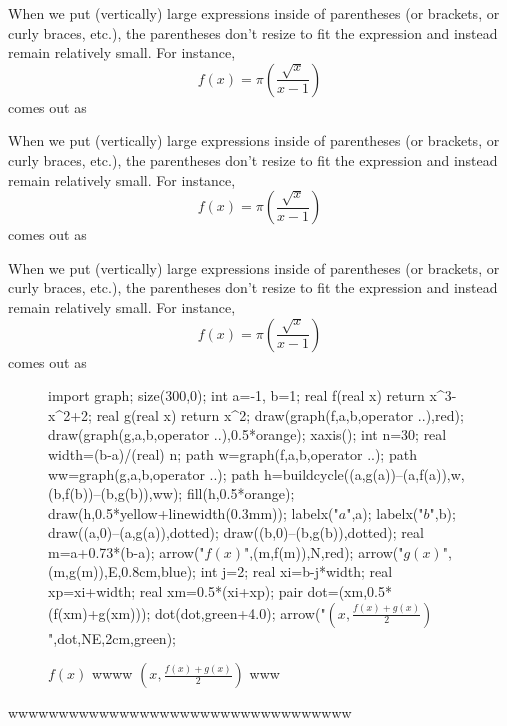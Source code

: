 \documentclass[a4paper]{report}
\begin{document}
When we put (vertically) large expressions inside of parentheses (or brackets, or curly braces, etc.), the parentheses don't resize to fit the expression and instead remain relatively small. For instance, $$f(x) = \pi(\frac{\sqrt{x}}{x-1})$$ comes out as

When we put (vertically) large expressions inside of parentheses (or brackets, or curly braces, etc.), the parentheses don't resize to fit the expression and instead remain relatively small. For instance, $$f(x) = \pi(\frac{\sqrt{x}}{x-1})$$ comes out as

When we put (vertically) large expressions inside of parentheses (or brackets, or curly braces, etc.), the parentheses don't resize to fit the expression and instead remain relatively small. For instance, $$f(x) = \pi(\frac{\sqrt{x}}{x-1})$$ comes out as





\begin{figure}[!ht]
	\centering
	\begin{asy}
	import graph;
	size(300,0);
	int a=-1, b=1;
	real f(real x) {return x^3-x^2+2;}
	real g(real x) {return x^2;}
	draw(graph(f,a,b,operator ..),red);
	draw(graph(g,a,b,operator ..),0.5*orange);
	xaxis();
	int n=30;
	real width=(b-a)/(real) n;
	path w=graph(f,a,b,operator ..);
	path ww=graph(g,a,b,operator ..);
	path h=buildcycle((a,g(a))--(a,f(a)),w,(b,f(b))--(b,g(b)),ww);
	fill(h,0.5*orange);
	draw(h,0.5*yellow+linewidth(0.3mm));
	labelx("$a$",a);
	labelx("$b$",b);
	draw((a,0)--(a,g(a)),dotted);
	draw((b,0)--(b,g(b)),dotted);
	real m=a+0.73*(b-a);
	arrow("$f(x)$",(m,f(m)),N,red);
	arrow("$g(x)$",(m,g(m)),E,0.8cm,blue);
	int j=2;
	real xi=b-j*width;
	real xp=xi+width;
	real xm=0.5*(xi+xp);
	pair dot=(xm,0.5*(f(xm)+g(xm)));
	dot(dot,green+4.0);
	arrow("$\left(x,\frac{f(x)+g(x)}{2}\right)$",dot,NE,2cm,green);
	\end{asy}
	\caption{$f(x)$ wwww $\left(x,\frac{f(x)+g(x)}{2}\right)$ www}
\end{figure}


wwwwwwwwwwwwwwwwwwwwwwwwwwwwwwwwww
\end{document}
